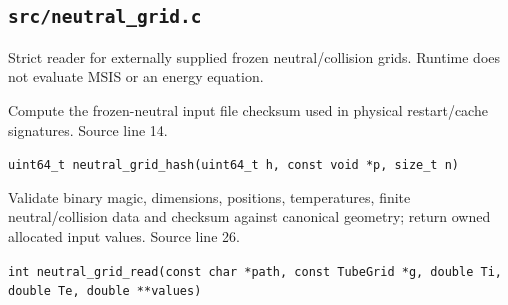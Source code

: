 \subsection{\texttt{src/neutral\_grid.c}}
Strict reader for externally supplied frozen neutral/collision grids. Runtime does not evaluate MSIS or an energy equation.
\begin{description}[style=nextline,leftmargin=0pt,labelindent=0pt,labelwidth=0pt,labelsep=0pt]
\item[\texttt{neutral\_grid\_hash}] Compute the frozen-neutral input file checksum used in physical restart/cache signatures. Source line 14.\par
{\small\nolinkurl{uint64_t neutral_grid_hash(uint64_t h, const void *p, size_t n)}}
\item[\texttt{neutral\_grid\_read}] Validate binary magic, dimensions, positions, temperatures, finite neutral/collision data and checksum against canonical geometry; return owned allocated input values. Source line 26.\par
{\small\nolinkurl{int neutral_grid_read(const char *path, const TubeGrid *g, double Ti, double Te, double **values)}}
\end{description}
